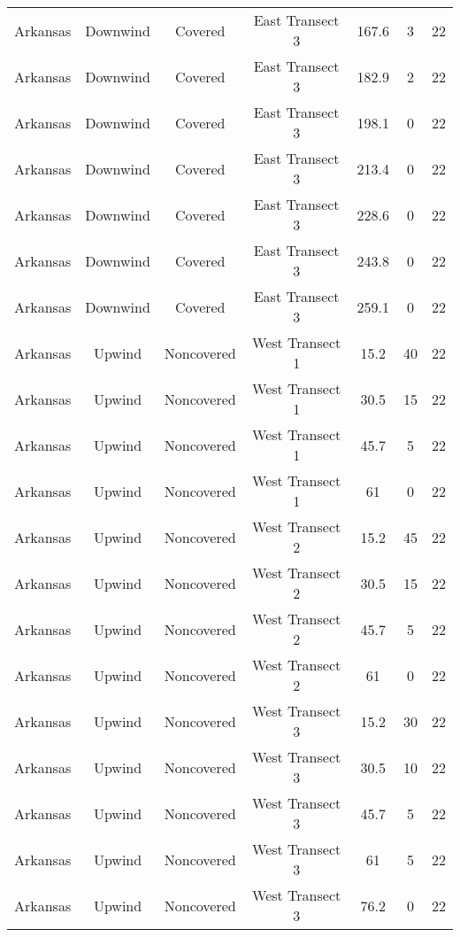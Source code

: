 \documentclass{article}
\begin{document}
\begin{longtable}[c]{ccccccc}
Arkansas  & Downwind  & Covered     & East Transect 3 & 167.6        & 3           & 22  \\
Arkansas  & Downwind  & Covered     & East Transect 3 & 182.9        & 2           & 22  \\
Arkansas  & Downwind  & Covered     & East Transect 3 & 198.1        & 0           & 22  \\
Arkansas  & Downwind  & Covered     & East Transect 3 & 213.4        & 0           & 22  \\
Arkansas  & Downwind  & Covered     & East Transect 3 & 228.6        & 0           & 22  \\
Arkansas  & Downwind  & Covered     & East Transect 3 & 243.8        & 0           & 22  \\
Arkansas  & Downwind  & Covered     & East Transect 3 & 259.1        & 0           & 22  \\
Arkansas  & Upwind    & Noncovered & West Transect 1 & 15.2         & 40          & 22  \\
Arkansas  & Upwind    & Noncovered & West Transect 1 & 30.5         & 15          & 22  \\
Arkansas  & Upwind    & Noncovered & West Transect 1 & 45.7         & 5           & 22  \\
Arkansas  & Upwind    & Noncovered & West Transect 1 & 61           & 0           & 22  \\
Arkansas  & Upwind    & Noncovered & West Transect 2 & 15.2         & 45          & 22  \\
Arkansas  & Upwind    & Noncovered & West Transect 2 & 30.5         & 15          & 22  \\
Arkansas  & Upwind    & Noncovered & West Transect 2 & 45.7         & 5           & 22  \\
Arkansas  & Upwind    & Noncovered & West Transect 2 & 61           & 0           & 22  \\
Arkansas  & Upwind    & Noncovered & West Transect 3 & 15.2         & 30          & 22  \\
Arkansas  & Upwind    & Noncovered & West Transect 3 & 30.5         & 10          & 22  \\
Arkansas  & Upwind    & Noncovered & West Transect 3 & 45.7         & 5           & 22  \\
Arkansas  & Upwind    & Noncovered & West Transect 3 & 61           & 5           & 22  \\
Arkansas  & Upwind    & Noncovered & West Transect 3 & 76.2         & 0           & 22  \\

\end{longtable}
\end{document}
